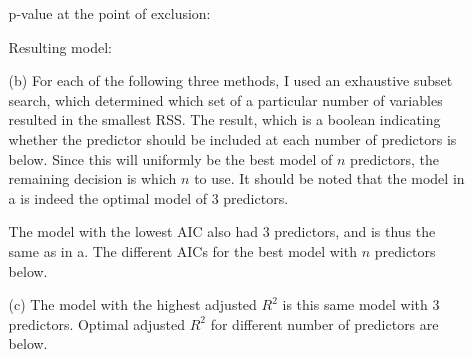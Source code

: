 \documentclass[11pt]{article}
\theoremstyle{definition}
\begin{document}
\begin{itemize}
\begin{itemize}
                p-value at the point of exclusion: \\
                \FloatBarrier
                 
                \FloatBarrier

                Resulting model: \\
                \FloatBarrier
                 
                \FloatBarrier

            \item[(b)]
                For each of the following three methods, I used an exhaustive subset search, which determined which set of a particular number of variables resulted in the smallest RSS. The result, which is a boolean indicating whether the predictor should be included at each number of predictors is below. Since this will uniformly be the best model of $n$ predictors, the remaining decision is which $n$ to use. It should be noted that the model in a is indeed the optimal model of $3$ predictors. \\
                \FloatBarrier
                 
                \FloatBarrier
                The model with the lowest AIC also had $3$ predictors, and is thus the same as in a. The different AICs for the best model with $n$ predictors  below. \\
                \FloatBarrier
                 
                \FloatBarrier

            \item[(c)]
                The model with the highest adjusted $R^2$ is this same model with $3$ predictors. Optimal adjusted $R^2$ for different number of predictors are below. \\
                \FloatBarrier
                 
                \FloatBarrier



\end{itemize}
\end{itemize}
\end{document}
